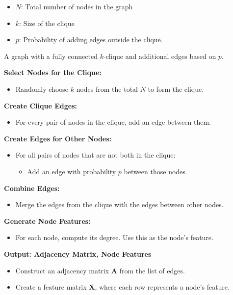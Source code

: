 \begin{algorithm}
\caption{Generating a Graph with an $k$-Clique}
\label{alg:k-clique}
\begin{algorithmic}[1]
    \Require 
        \begin{itemize}
            \item $N$: Total number of nodes in the graph
            \item $k$: Size of the clique
            \item $p$: Probability of adding edges outside the clique.
        \end{itemize}
    \Ensure A graph with a fully connected $k$-clique and additional edges based on $p$.

    \State \textbf{Select Nodes for the Clique:}
        \begin{itemize}
            \item Randomly choose $k$ nodes from the total $N$ to form the clique.
        \end{itemize}
    
    \State \textbf{Create Clique Edges:}
        \begin{itemize}
            \item For every pair of nodes in the clique, add an edge between them.
        \end{itemize}

    \State \textbf{Create Edges for Other Nodes:}
        \begin{itemize}
            \item For all pairs of nodes that are not both in the clique:
            \begin{itemize}
                \item Add an edge with probability $p$ between those nodes.
            \end{itemize}
        \end{itemize}

    \State \textbf{Combine Edges:}
        \begin{itemize}
            \item Merge the edges from the clique with the edges between other nodes.
        \end{itemize}

    \State \textbf{Generate Node Features:}
        \begin{itemize}
            \item For each node, compute its degree. Use this as the node's feature.
        \end{itemize}

   \State \textbf{Output: Adjacency Matrix, Node Features}
        \begin{itemize}
            \item Construct an adjacency matrix $\mathbf{A}$ from the list of edges.
            \item Create a feature matrix $\mathbf{X}$, where each row represents a node's feature.
        \end{itemize}


\end{algorithmic}
\end{algorithm}



